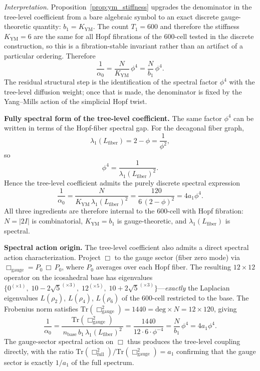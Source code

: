\documentclass[12pt,a4paper]{article}
\theoremstyle{definition}
\begin{document}
\noindent\textit{Interpretation.}  Proposition~\ref{prop:ym_stiffness} upgrades the denominator in the tree-level coefficient from a bare algebraic symbol to an exact discrete gauge-theoretic quantity: $b_1 = K_{\mathrm{YM}}$.  The count $T_1 = 600$ and therefore the stiffness $K_{\mathrm{YM}} = 6$ are the same for all Hopf fibrations of the 600-cell tested in the discrete construction, so this is a fibration-stable invariant rather than an artifact of a particular ordering.  Therefore
\begin{equation}
\frac{1}{\alpha_0} = \frac{N}{K_{\mathrm{YM}}}\,\phi^4 = \frac{N}{b_1}\,\phi^4.
\label{eq:alpha0_kym}
\end{equation}
The residual structural step is the identification of the spectral factor $\phi^4$ with the tree-level diffusion weight; once that is made, the denominator is fixed by the Yang--Mills action of the simplicial Hopf twist.

\textbf{Fully spectral form of the tree-level coefficient.}  The same factor $\phi^4$ can be written in terms of the Hopf-fiber spectral gap.  For the decagonal fiber graph,
\begin{equation}
\lambda_1(L_{\mathrm{fiber}}) = 2 - \phi = \frac{1}{\phi^2},
\end{equation}
so
\begin{equation}
\phi^4 = \frac{1}{\lambda_1(L_{\mathrm{fiber}})^2}.
\end{equation}
Hence the tree-level coefficient admits the purely discrete spectral expression
\begin{equation}
\frac{1}{\alpha_0}
= \frac{N}{K_{\mathrm{YM}}\,\lambda_1(L_{\mathrm{fiber}})^2}
= \frac{120}{6\,(2-\phi)^2}
= 4a_1\phi^4.
\label{eq:alpha0_spectral}
\end{equation}
All three ingredients are therefore internal to the 600-cell with Hopf fibration: $N=|2I|$ is combinatorial, $K_{\mathrm{YM}} = b_1$ is gauge-theoretic, and $\lambda_1(L_{\mathrm{fiber}})$ is spectral.

\textbf{Spectral action origin.}  The tree-level coefficient also admits a direct spectral action characterization.  Project $\Box$ to the gauge sector (fiber zero mode) via $\Box_{\mathrm{gauge}} = P_0\,\Box\,P_0$, where $P_0$ averages over each Hopf fiber.  The resulting $12\times12$ operator on the icosahedral base has eigenvalues $\{0^{(\times1)},\; 10-2\sqrt{5}^{(\times3)},\; 12^{(\times5)},\; 10+2\sqrt{5}^{(\times3)}\}$---\emph{exactly} the Laplacian eigenvalues $L(\rho_2)$, $L(\rho_4)$, $L(\rho_6)$ of the 600-cell restricted to the base.  The Frobenius norm satisfies $\mathrm{Tr}(\Box_{\mathrm{gauge}}^2) = 1440 = \mathrm{deg}\times N = 12\times 120$, giving
\begin{equation}
\frac{1}{\alpha_0} = \frac{\mathrm{Tr}(\Box_{\mathrm{gauge}}^2)}{\,n_{\mathrm{base}}\,b_1\,\lambda_1(L_{\mathrm{fiber}})^2\,}
= \frac{1440}{12\cdot 6\cdot\phi^{-4}} = \frac{N}{b_1}\,\phi^4 = 4a_1\phi^4.
\label{eq:alpha0_box}
\end{equation}
The gauge-sector spectral action on $\Box$ thus produces the tree-level coupling directly, with the ratio $\mathrm{Tr}(\Box^2_{\mathrm{full}})/\mathrm{Tr}(\Box^2_{\mathrm{gauge}}) = a_1$ confirming that the gauge sector is exactly $1/a_1$ of the full spectrum.
\end{document}
